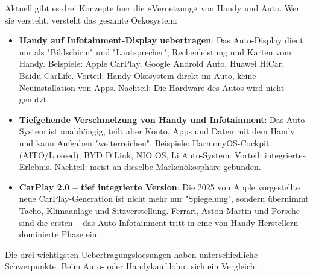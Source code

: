 


Aktuell gibt es drei Konzepte fuer die »Vernetzung« von Handy und Auto. Wer sie versteht, versteht das gesamte Oekosystem:

\begin{itemize}
  \item \textbf{Handy auf Infotainment-Display uebertragen}: Das Auto-Display dient nur als "Bildschirm" und "Lautsprecher"; Rechenleistung und Karten vom Handy. Beispiele: Apple CarPlay, Google Android Auto, Huawei HiCar, Baidu CarLife. Vorteil: Handy-Ökosystem direkt im Auto, keine Neuinstallation von Apps. Nachteil: Die Hardware des Autos wird nicht genutzt.
  \item \textbf{Tiefgehende Verschmelzung von Handy und Infotainment}: Das Auto-System ist unabhängig, teilt aber Konto, Apps und Daten mit dem Handy und kann Aufgaben "weiterreichen". Beispiele: HarmonyOS-Cockpit (AITO/Luxeed), BYD DiLink, NIO OS, Li Auto-System. Vorteil: integriertes Erlebnis. Nachteil: meist an dieselbe Markenökosphäre gebunden.
  \item \textbf{CarPlay 2.0 – tief integrierte Version}: Die 2025 von Apple vorgestellte neue CarPlay-Generation ist nicht mehr nur "Spiegelung", sondern übernimmt Tacho, Klimaanlage und Sitzverstellung. Ferrari, Aston Martin und Porsche sind die ersten – das Auto-Infotainment tritt in eine von Handy-Herstellern dominierte Phase ein.
\end{itemize}


Die drei wichtigsten Uebertragungsloesungen haben unterschiedliche Schwerpunkte. Beim Auto- oder Handykauf lohnt sich ein Vergleich:

